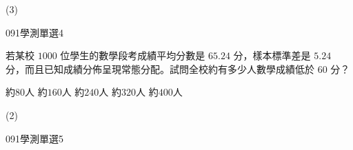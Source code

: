 \begin{QUESTIONS}
\begin{QUESTION}
\begin{QBODY}
        \end{QBODY}
        \begin{QFROMS}
        \end{QFROMS}
        \begin{QTAGS}\end{QTAGS}
        \begin{QANS}
            (3)
        \end{QANS}
        \begin{QSOLLIST}
        \end{QSOLLIST}
        \begin{QEMPTYSPACE}
        \end{QEMPTYSPACE}
    \end{QUESTION}
    \begin{QUESTION}
        \begin{ExamInfo}{091}{學測}{單選}{4}
        \end{ExamInfo}
        \begin{ExamAnsRateInfo}{35}{60}{27}{18}
        \end{ExamAnsRateInfo}
        \begin{QBODY}
            若某校 $1000$ 位學生的數學段考成績平均分數是 $65.24$ 分，樣本標準差是 $5.24$ 分，而且已知成績分佈呈現常態分配。試問全校約有多少人數學成績低於 $60$ 分？
            \begin{QOPS}
                \QOP 約$80$人  
                \QOP 約$160$人 
                \QOP 約$240$人 
                \QOP 約$320$人 
                \QOP 約$400$人
            \end{QOPS}
        \end{QBODY}
        \begin{QFROMS}
        \end{QFROMS}
        \begin{QTAGS}\end{QTAGS}
        \begin{QANS}
            (2)
        \end{QANS}
        \begin{QSOLLIST}
        \end{QSOLLIST}
        \begin{QEMPTYSPACE}
        \end{QEMPTYSPACE}
    \end{QUESTION}
    \begin{QUESTION}
        \begin{ExamInfo}{091}{學測}{單選}{5}
        \end{ExamInfo}

\end{QUESTION}
\end{QUESTIONS}

